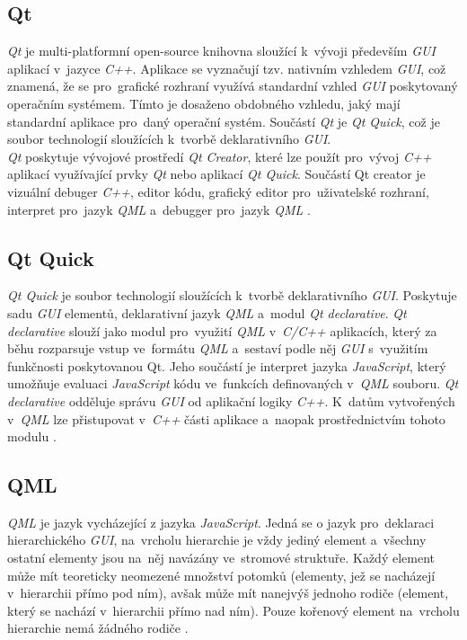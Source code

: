 \documentclass[11pt,twoside,a4paper]{book}
\begin{document}
\subsection{Qt}
\textit{Qt} je multi-platformní open-source knihovna sloužící k~vývoji především \textit{GUI} aplikací v~jazyce \textit{C++}. Aplikace se vyznačují tzv. nativním vzhledem \textit{GUI}, což znamená, že se pro~grafické rozhraní využívá standardní vzhled \textit{GUI} poskytovaný operačním systémem. Tímto je dosaženo obdobného vzhledu, jaký mají standardní aplikace pro~daný operační systém. Součástí \textit{Qt} je \textit{Qt Quick}, což je soubor technologií sloužících k~tvorbě deklarativního \textit{GUI}.\\
\textit{Qt} poskytuje vývojové prostředí \textit{Qt Creator}, které lze použít pro~vývoj \textit{C++} aplikací využívající prvky \textit{Qt} nebo aplikací \textit{Qt Quick}. Součástí Qt creator je vizuální debuger \textit{C++}, editor kódu, grafický editor pro~uživatelské rozhraní, interpret pro~jazyk \textit{QML} a~debugger pro~jazyk \textit{QML} \cite{bib:Qt}.

\subsection{Qt Quick}
\textit{Qt Quick} je soubor technologií sloužících k~tvorbě deklarativního \textit{GUI}. Poskytuje sadu \textit{GUI} elementů, deklarativní jazyk \textit{QML} a~modul \textit{Qt declarative}. \textit{Qt declarative} slouží jako modul pro~využití \textit{QML} v~\textit{C/C++} aplikacích, který za běhu rozparsuje vstup ve~formátu \textit{QML} a~sestaví podle něj \textit{GUI} s~využitím funkčnosti poskytovanou Qt. Jeho součástí je interpret jazyka \textit{JavaScript}, který umožňuje evaluaci \textit{JavaScript} kódu ve~funkcích definovaných v~\textit{QML} souboru. \textit{Qt declarative} odděluje správu \textit{GUI} od aplikační logiky \textit{C++}. K~datům vytvořených v~\textit{QML} lze přistupovat v~\textit{C++} části aplikace a~naopak prostřednictvím tohoto modulu \cite{bib:Qt}.

\subsection{QML}
\textit{QML} je jazyk vycházející z jazyka \textit{JavaScript}. Jedná se o jazyk pro~deklaraci hierarchického \textit{GUI}, na~vrcholu hierarchie je vždy jediný element a~všechny ostatní elementy jsou na~něj navázány ve~stromové struktuře. Každý element může mít teoreticky neomezené množství potomků (elementy, jež se nacházejí v~hierarchii přímo pod ním), avšak může mít nanejvýš jednoho rodiče (element, který se nachází v~hierarchii přímo nad ním). Pouze kořenový element na~vrcholu hierarchie nemá žádného rodiče \cite{bib:QML}.
\end{document}
